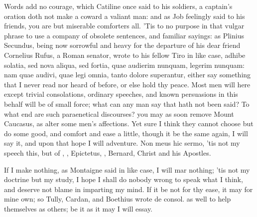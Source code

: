 {Words add no courage, which Catiline once said to his soldiers, a
captain's oration doth not make a coward a valiant man: and as Job
 feelingly said to his friends, you are but miserable comforters
all. 'Tis to no purpose in that vulgar phrase to use a company of
obsolete sentences, and familiar sayings: as Plinius Secundus,
being now sorrowful and heavy for the departure of his dear friend
Cornelius Rufus, a Roman senator, wrote to his fellow Tiro in like
case, adhibe solatia, sed nova aliqua, sed fortia, quae audierim
nunquam, legerim nunquam: nam quae audivi, quae legi omnia, tanto
dolore superantur, either say something that I never read nor heard of
before, or else hold thy peace. Most men will here except trivial
consolations, ordinary speeches, and known persuasions in this behalf
will be of small force; what can any man say that hath not been said?
To what end are such paraenetical discourses? you may as soon remove
Mount Caucasus, as alter some men's affections. Yet sure I think they
cannot choose but do some good, and comfort and ease a little, though
it be the same again, I will say it, and upon that hope I will
adventure. Non meus hic sermo, 'tis not my speech this, but of
\Seneca, \Plutarch, Epictetus, \Austin{}, Bernard, Christ and his Apostles.

If I make nothing, as Montaigne said in like case, I will mar
nothing; 'tis not my doctrine but my study, I hope I shall do nobody
wrong to speak what I think, and deserve not blame in imparting my
mind. If it be not for thy ease, it may for mine own; so Tully, Cardan,
and Boethius wrote de consol. as well to help themselves as others; be
it as it may I will essay.

}
